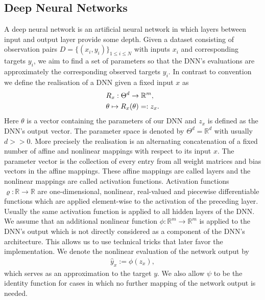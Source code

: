 \documentclass[conference]{IEEEtran}
\begin{document}
	\subsection{Deep Neural Networks}
	\noindent
	A deep neural network is an artificial neural network in which layers between input and output layer provide some depth. Given a dataset consisting of observation pairs $D =\{(x_{i}, y_{i})\}_{1\leq i\leq N}$ with inputs $x_{i}$ and corresponding targets $y_{i}$, we aim to find a set of parameters so that the DNN's evaluations are approximately the corresponding observed targets $y_{i}$. In contrast to convention we define the realisation of a DNN given a fixed input $x$ as
	\begin{align}
	&R_{x}:\Theta^{d}\rightarrow\mathbb{R}^{m}, \notag\\
	&\theta\mapsto R_{x}(\theta) =: z_{x}.
	\end{align}
	Here $\theta$ is a vector containing the parameters of our DNN and $z_{x}$ is defined as the DNN's output vector. The parameter space is denoted by $\Theta^{d} = \mathbb{R}^{d}$ with usually $d>>0$. More precisely the realisation is an alternating concatenation of a fixed number of affine and nonlinear mappings with respect to its input $x$. The parameter vector is the collection of every entry from all weight matrices and bias vectors in the affine mappings. These affine mappings are called layers and the nonlinear mappings are called activation functions. Activation functions $\varrho:\mathbb{R}\rightarrow\mathbb{R}$ are one-dimensional, nonlinear, real-valued and piecewise differentiable functions which are applied element-wise to the activation of the preceding layer. Usually the same activation function is applied to all hidden layers of the DNN.\\ We assume that an additional nonlinear function $\phi:\mathbb{R}^{m}\rightarrow\mathbb{R}^{m}$ is applied to the DNN's output which is not directly considered as a component of the DNN's architecture. This allows us to use technical tricks that later favor the implementation. We denote the nonlinear evaluation of the network output by
	\begin{align}
	\hat{y}_{x} := \phi(z_{x}),
	\end{align}
	which serves as an approximation to the target $y$. We also allow $\psi$ to be the identity function for cases in which no further mapping of the network output is needed.
	
	
\end{document}
